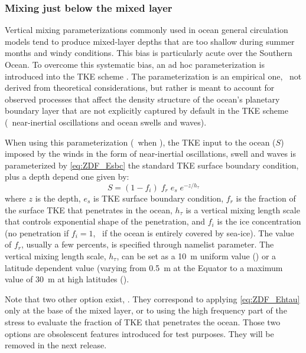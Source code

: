 \documentclass[../main/NEMO_manual]{subfiles}
\begin{document}
\subsubsection{Mixing just below the mixed layer}

Vertical mixing parameterizations commonly used in ocean general circulation models tend to
produce mixed-layer depths that are too shallow during summer months and windy conditions.
This bias is particularly acute over the Southern Ocean.
To overcome this systematic bias, an ad hoc parameterization is introduced into the TKE scheme \cite{rodgers.aumont.ea_B14}.
The parameterization is an empirical one, \ie\ not derived from theoretical considerations,
but rather is meant to account for observed processes that affect the density structure of
the ocean’s planetary boundary layer that are not explicitly captured by default in the TKE scheme
(\ie\ near-inertial oscillations and ocean swells and waves).

When using this parameterization (\ie\ when ),
the TKE input to the ocean ($S$) imposed by the winds in the form of near-inertial oscillations,
swell and waves is parameterized by \autoref{eq:ZDF_Esbc} the standard TKE surface boundary condition,
plus a depth depend one given by:
\begin{equation}
  \label{eq:ZDF_Ehtau}
  S = (1-f_i) \; f_r \; e_s \; e^{-z / h_\tau}
\end{equation}
where $z$ is the depth, $e_s$ is TKE surface boundary condition, $f_r$ is the fraction of the surface TKE that
penetrates in the ocean, $h_\tau$ is a vertical mixing length scale that controls exponential shape of
the penetration, and $f_i$ is the ice concentration
(no penetration if $f_i=1$, \ie\ if the ocean is entirely covered by sea-ice).
The value of $f_r$, usually a few percents, is specified through  namelist parameter.
The vertical mixing length scale, $h_\tau$, can be set as a 10~m uniform value () or
a latitude dependent value (varying from 0.5~m at the Equator to a maximum value of 30~m at high latitudes
().

Note that two other option exist, .
They correspond to applying \autoref{eq:ZDF_Ehtau} only at the base of the mixed layer,
or to using the high frequency part of the stress to evaluate the fraction of TKE that penetrates the ocean.
Those two options are obsolescent features introduced for test purposes.
They will be removed in the next release.
\end{document}
